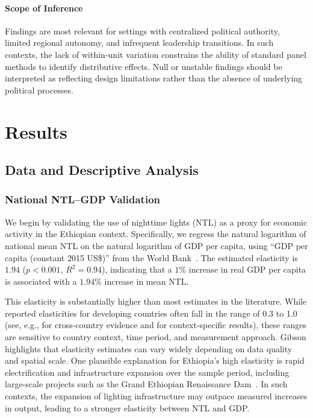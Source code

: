\documentclass[12pt,a4paper]{article}
\begin{document}
\paragraph{Scope of Inference}
Findings are most relevant for settings with centralized political authority, limited regional autonomy, and infrequent leadership transitions. In such contexts, the lack of within-unit variation constrains the ability of standard panel methods to identify distributive effects. Null or unstable findings should be interpreted as reflecting design limitations rather than the absence of underlying political processes.


\section{Results}

\subsection{Data and Descriptive Analysis}

\subsubsection{National NTL–GDP Validation}

We begin by validating the use of nighttime lights (NTL) as a proxy for economic activity in the Ethiopian context. Specifically, we regress the natural logarithm of national mean NTL on the natural logarithm of GDP per capita, using ``GDP per capita (constant 2015 US\$)'' from the World Bank~\citep{WorldBank2024}. The estimated elasticity is $1.94$ ($p<0.001$, $R^2=0.94$), indicating that a $1\%$ increase in real GDP per capita is associated with a $1.94\%$ increase in mean NTL.


This elasticity is substantially higher than most estimates in the literature. While reported elasticities for developing countries often fall in the range of 0.3 to 1.0 (see, e.g., \citealt{Henderson2012} for cross-country evidence and \citealt{Bickenbach2016} for context-specific results), these ranges are sensitive to country context, time period, and measurement approach. Gibson \citeyearpar{Gibson2021} highlights that elasticity estimates can vary widely depending on data quality and spatial scale. One plausible explanation for Ethiopia’s high elasticity is rapid electrification and infrastructure expansion over the sample period, including large-scale projects such as the Grand Ethiopian Renaissance Dam~\citep{WorldBank2019}. In such contexts, the expansion of lighting infrastructure may outpace measured increases in output, leading to a stronger elasticity between NTL and GDP.
\end{document}
